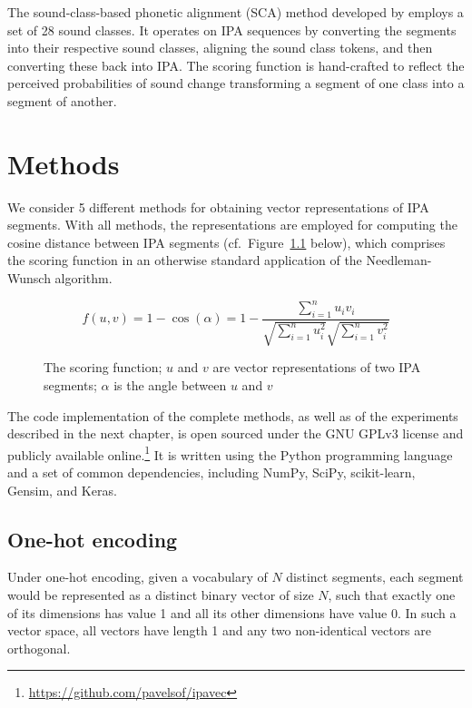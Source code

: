 \documentclass[a4paper]{report}
\begin{document}
The sound-class-based phonetic alignment (SCA) method developed by \citet{2012_List} employs a set of 28 sound classes.
It operates on IPA sequences by converting the segments into their respective sound classes, aligning the sound class tokens, and then converting these back into IPA.
The scoring function is hand-crafted to reflect the perceived probabilities of sound change transforming a segment of one class into a segment of another.


\chapter{Methods}

We consider 5 different methods for obtaining vector representations of IPA segments.
With all methods, the representations are employed for computing the cosine distance between IPA segments (cf.~Figure~\ref{fig:cosine} below),
which comprises the scoring function in an otherwise standard application of the Needleman-Wunsch algorithm.

\begin{figure}[h]
	\begin{displaymath}
		f(u, v) = 1-\cos(\alpha) = 1-\frac{\displaystyle\sum_{i=1}^n u_i v_i}{\sqrt{\displaystyle\sum_{i=1}^n u_i^2}\sqrt{\displaystyle\sum_{i=1}^n v_i^2}}
	\end{displaymath}

	\caption{The scoring function; $u$ and $v$ are vector representations of two IPA segments; $\alpha$ is the angle between $u$ and $v$}
	\label{fig:cosine}
\end{figure}

The code implementation of the complete methods, as well as of the experiments described in the next chapter,
is open sourced under the GNU GPLv3 license and publicly available online.\footnote{\url{https://github.com/pavelsof/ipavec}}
It is written using the Python programming language and a set of common dependencies, including NumPy, SciPy, scikit-learn, Gensim, and Keras.


\section{One-hot encoding}

Under one-hot encoding, given a vocabulary of $N$ distinct segments, each segment would be represented as a distinct binary vector of size $N$,
such that exactly one of its dimensions has value 1 and all its other dimensions have value 0.
In such a vector space, all vectors have length 1 and any two non-identical vectors are orthogonal.
\end{document}
